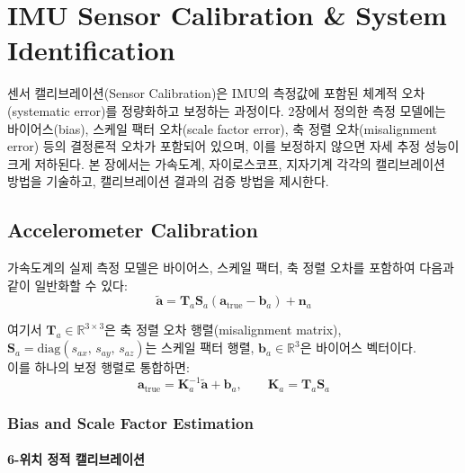 \section{IMU Sensor Calibration \& System Identification}
    센서 캘리브레이션(Sensor Calibration)은 IMU의 측정값에 포함된 체계적 오차(systematic error)를 정량화하고 보정하는 과정이다. 2장에서 정의한 측정 모델에는 바이어스(bias), 스케일 팩터 오차(scale factor error), 축 정렬 오차(misalignment error) 등의 결정론적 오차가 포함되어 있으며, 이를 보정하지 않으면 자세 추정 성능이 크게 저하된다. 본 장에서는 가속도계, 자이로스코프, 지자기계 각각의 캘리브레이션 방법을 기술하고, 캘리브레이션 결과의 검증 방법을 제시한다.\\

    \subsection{Accelerometer Calibration}
        가속도계의 실제 측정 모델은 바이어스, 스케일 팩터, 축 정렬 오차를 포함하여 다음과 같이 일반화할 수 있다:\\

        \begin{equation}
            \tilde{\mathbf{a}} = \mathbf{T}_a \mathbf{S}_a \left( \mathbf{a}_{\text{true}} - \mathbf{b}_a \right) + \mathbf{n}_a
            \label{eq:accel_full_model}
        \end{equation}

        \noindent 여기서 $\mathbf{T}_a \in \mathbb{R}^{3\times 3}$은 축 정렬 오차 행렬(misalignment matrix), $\mathbf{S}_a = \text{diag}(s_{ax},\, s_{ay},\, s_{az})$는 스케일 팩터 행렬, $\mathbf{b}_a \in \mathbb{R}^3$은 바이어스 벡터이다.\\

        이를 하나의 보정 행렬로 통합하면:\\

        \begin{equation}
            \mathbf{a}_{\text{true}} = \mathbf{K}_a^{-1} \tilde{\mathbf{a}} + \mathbf{b}_a, \qquad \mathbf{K}_a = \mathbf{T}_a \mathbf{S}_a
            \label{eq:accel_calib_matrix}
        \end{equation}

        \subsubsection{Bias and Scale Factor Estimation}
            \paragraph{6-위치 정적 캘리브레이션}

